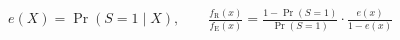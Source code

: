 \documentclass[border=8pt]{standalone}
\begin{document}
$\displaystyle e(X)=\Pr(S{=}1\mid X),\qquad \frac{f_{\mathrm{R}}(x)}{f_{\mathrm{E}}(x)}=\frac{1-\Pr(S{=}1)}{\Pr(S{=}1)}\cdot\frac{e(x)}{1-e(x)}$
\end{document}
